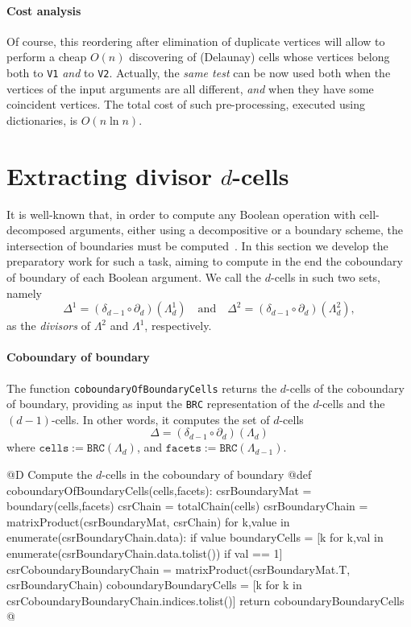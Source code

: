 \documentclass[11pt,oneside]{article}	%
\begin{document}
\paragraph{Cost analysis} 
Of course, this reordering after elimination of duplicate vertices will allow to perform a cheap $O(n)$ discovering of (Delaunay) cells whose vertices belong both to \texttt{V1} \emph{and} to \texttt{V2}. 
Actually, the \emph{same test} can be now used both when the vertices of the input arguments are all different, \emph{and} when they have some coincident vertices.
The total cost of such pre-processing, executed using dictionaries, is $O(n\ln n)$.


\section{Extracting divisor $d$-cells}

It is well-known that, in order to compute any Boolean operation with cell-decomposed arguments, either using a decompositive or a boundary scheme, the intersection of boundaries must be computed~\cite{Paoluzzi:1989:BAO:70248.70249}. In this section we develop the preparatory work for such a task, aiming to compute in the end the coboundary of boundary of each Boolean argument. We call the $d$-cells in such two sets, namely
\[
\Delta^1 = (\delta_{d-1}\circ\partial_d)(\Lambda^1_d)
\quad\mbox{and}\quad
\Delta^2 = (\delta_{d-1}\circ\partial_d)(\Lambda^2_d),
\]
as the \emph{divisors} of $\Lambda^2$ and $\Lambda^1$, respectively.


\paragraph{Coboundary of boundary}

The function \texttt{coboundaryOfBoundaryCells} returns the $d$-cells of the coboundary of boundary, providing as input the \texttt{BRC} representation of the $d$-cells and the $(d-1)$-cells. In other words, it computes the set of $d$-cells
\[
\Delta = (\delta_{d-1}\circ\partial_d)(\Lambda_d)
\]
where $\texttt{cells} := \texttt{BRC}(\Lambda_d)$, and $\texttt{facets} := \texttt{BRC}(\Lambda_{d-1})$.

@D Compute the $d$-cells in the coboundary of boundary
@{def coboundaryOfBoundaryCells(cells,facets):
    csrBoundaryMat = boundary(cells,facets)
    csrChain = totalChain(cells)
    csrBoundaryChain = matrixProduct(csrBoundaryMat, csrChain)
    for k,value in enumerate(csrBoundaryChain.data):
        if value %
    boundaryCells = [k for k,val in enumerate(csrBoundaryChain.data.tolist())
                               if val == 1]
    csrCoboundaryBoundaryChain = matrixProduct(csrBoundaryMat.T, csrBoundaryChain)
    coboundaryBoundaryCells = [k for k in csrCoboundaryBoundaryChain.indices.tolist()]
    return coboundaryBoundaryCells
@}
\end{document}
